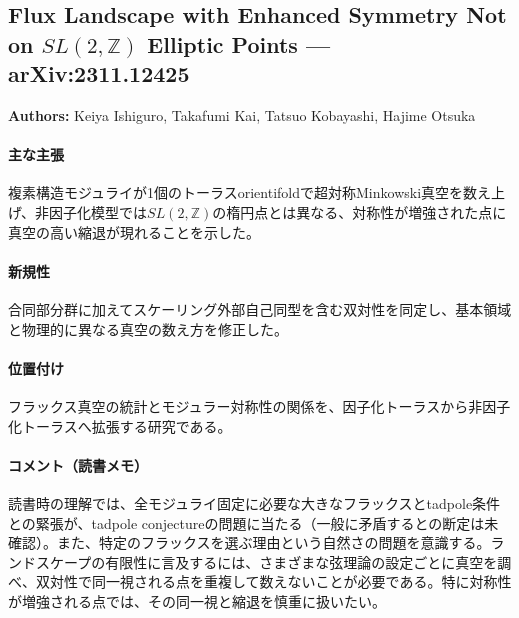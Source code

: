 \subsection{Flux Landscape with Enhanced Symmetry Not on \(SL(2,\mathbb{Z})\) Elliptic Points --- arXiv:2311.12425}

\textbf{Authors:} Keiya Ishiguro, Takafumi Kai, Tatsuo Kobayashi, Hajime Otsuka

\paragraph{主な主張}
複素構造モジュライが1個のトーラスorientifoldで超対称Minkowski真空を数え上げ、非因子化模型では\(SL(2,\mathbb{Z})\)の楕円点とは異なる、対称性が増強された点に真空の高い縮退が現れることを示した。 \cite{Ishiguro:2023wwf}

\paragraph{新規性}
合同部分群に加えてスケーリング外部自己同型を含む双対性を同定し、基本領域と物理的に異なる真空の数え方を修正した。

\paragraph{位置付け}
フラックス真空の統計とモジュラー対称性の関係を、因子化トーラスから非因子化トーラスへ拡張する研究である。

\paragraph{コメント（読書メモ）}
読書時の理解では、全モジュライ固定に必要な大きなフラックスとtadpole条件との緊張が、tadpole conjectureの問題に当たる（一般に矛盾するとの断定は未確認）。また、特定のフラックスを選ぶ理由という自然さの問題を意識する。ランドスケープの有限性に言及するには、さまざまな弦理論の設定ごとに真空を調べ、双対性で同一視される点を重複して数えないことが必要である。特に対称性が増強される点では、その同一視と縮退を慎重に扱いたい。
